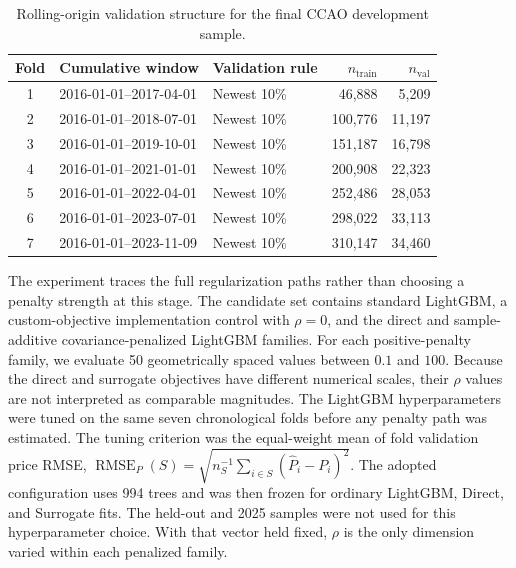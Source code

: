\documentclass[10pt]{article}
\theoremstyle{definition}
\newcommand{\1}{\mathbf{1}}
\begin{document}
\begin{table}[!ht]
\centering
\caption{Rolling-origin validation structure for the final CCAO development sample.}
\label{tab:fold_structure}
\begin{tabular}{cllrr}
\toprule
Fold & Cumulative window & Validation rule & $n_{\mathrm{train}}$ & $n_{\mathrm{val}}$ \\
\midrule
1 & 2016-01-01--2017-04-01 & Newest 10\% & 46,888 & 5,209 \\
2 & 2016-01-01--2018-07-01 & Newest 10\% & 100,776 & 11,197 \\
3 & 2016-01-01--2019-10-01 & Newest 10\% & 151,187 & 16,798 \\
4 & 2016-01-01--2021-01-01 & Newest 10\% & 200,908 & 22,323 \\
5 & 2016-01-01--2022-04-01 & Newest 10\% & 252,486 & 28,053 \\
6 & 2016-01-01--2023-07-01 & Newest 10\% & 298,022 & 33,113 \\
7 & 2016-01-01--2023-11-09 & Newest 10\% & 310,147 & 34,460 \\
\bottomrule
\end{tabular}
\end{table}

The experiment traces the full regularization paths rather than choosing a penalty
strength at this stage. The candidate set contains standard LightGBM, a
custom-objective implementation control with $\rho=0$, and the direct and
sample-additive covariance-penalized LightGBM families. For each positive-penalty
family, we evaluate 50 geometrically spaced values between $0.1$ and $100$. Because
the direct and surrogate objectives have different numerical scales, their $\rho$
values are not interpreted as comparable magnitudes. The LightGBM hyperparameters were tuned on the same seven chronological folds before any penalty path was estimated. The tuning criterion was the equal-weight mean of fold validation price RMSE, $\operatorname{RMSE}_P(S)=\sqrt{n_S^{-1}\sum_{i\in S}(\widehat P_i-P_i)^2}$. The adopted configuration uses 994 trees and was then frozen for ordinary LightGBM, Direct, and Surrogate fits. The held-out and 2025 samples were not used for this hyperparameter choice. With that vector held fixed, $\rho$ is the only dimension varied within each penalized family.

\end{document}
